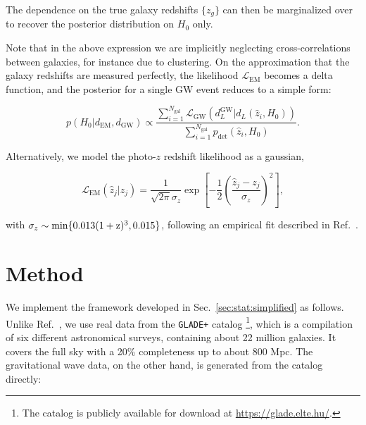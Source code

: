 \documentclass[%
preprint,
nofootinbib,
 amsmath,amssymb,
 aps,
]{revtex4-2}
\newcommand{\given}[2]{p( #1 | #2 )}
\newcommand{\pdet}[0]{p_{\text{det}}}
\begin{document}
The dependence on the true galaxy redshifts $\{z_g\}$ can then be marginalized over to recover the
posterior distribution on $H_0$ only.

Note that in the above expression we are implicitly neglecting cross-correlations between galaxies,
for instance due to clustering. On the approximation that the galaxy redshifts are measured
perfectly, the likelihood $\mathcal{L}_\text{EM}$ becomes a delta function, and the posterior for a
single GW event reduces to a simple form:

\begin{equation}
	\label{eq:stat:perfect-redshift-posterior}
	\given{H_0}{d_\text{EM}, d_\text{GW}} \propto
	\frac{\sum_{i=1}^{N_\text{gal}} \mathcal{L}_\text{GW}(d^\text{GW}_L | d_L(\hat{z}_i, H_0))}{\sum_{i=1}^{N_\text{gal}} \pdet(\hat{z}_i, H_0)}.
\end{equation}

Alternatively, we model the photo-$z$ redshift likelihood as a gaussian,

\begin{equation}
	\label{eq:stat:photo-z-likelihood}
	\mathcal{L}_\text{EM}(\hat{z}_j | z_j) = \frac{1}{\sqrt{2 \pi} \sigma_z} \exp{\left [-\frac{1}{2} \left (\frac{\hat{z}_j - z_j}{\sigma_z} \right )^2 \right ]},
\end{equation}

with $\sigma_z \sim \rm{min}\{0.013(1+z)^3, 0.015\}$, following an empirical fit described in
Ref.~.

\section{Method}

We implement the framework developed in Sec.~\ref{sec:stat:simplified} as follows. Unlike
Ref.~, we use real data from the \texttt{GLADE+} catalog
\cite{D_lya_2018,D_lya_2022} \footnote{The catalog is publicly available for download at
	\url{https://glade.elte.hu/}.}, which is a compilation of six different astronomical surveys,
containing about 22 million galaxies. It covers the full sky with a 20\% completeness up to about
800 Mpc. The gravitational wave data, on the other hand, is generated from the catalog directly:
\end{document}
